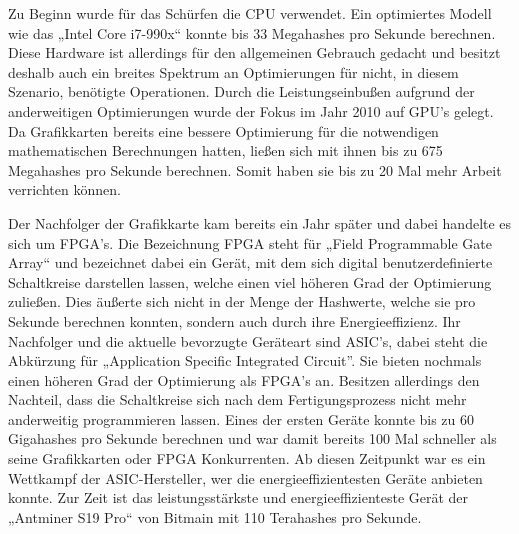 Zu Beginn wurde für das Schürfen die CPU verwendet. Ein optimiertes Modell wie das „Intel Core i7-990x“ konnte bis 33 Megahashes pro Sekunde berechnen. Diese Hardware ist allerdings für den allgemeinen Gebrauch gedacht und besitzt deshalb auch ein breites Spektrum an Optimierungen für nicht, in diesem Szenario, benötigte Operationen. Durch die Leistungseinbußen aufgrund der anderweitigen Optimierungen wurde der Fokus im Jahr 2010 auf GPU’s gelegt. Da Grafikkarten bereits eine bessere Optimierung für die notwendigen mathematischen Berechnungen hatten, ließen sich mit ihnen bis zu 675 Megahashes pro Sekunde berechnen. Somit haben sie bis zu 20 Mal mehr Arbeit verrichten können.

Der Nachfolger der Grafikkarte kam bereits ein Jahr später und dabei handelte es sich um FPGA’s. Die Bezeichnung FPGA steht für „Field Programmable Gate Array“ und bezeichnet dabei ein Gerät, mit dem sich digital benutzerdefinierte Schaltkreise darstellen lassen, welche einen viel höheren Grad der Optimierung zuließen. Dies äußerte sich nicht in der Menge der Hashwerte, welche sie pro Sekunde berechnen konnten, sondern auch durch ihre Energieeffizienz. Ihr Nachfolger und die aktuelle bevorzugte Geräteart sind ASIC’s, dabei steht die Abkürzung für „Application Specific Integrated Circuit”. Sie bieten nochmals einen höheren Grad der Optimierung als FPGA’s an. Besitzen allerdings den Nachteil, dass die Schaltkreise sich nach dem Fertigungsprozess nicht mehr anderweitig programmieren lassen. Eines der ersten Geräte konnte bis zu 60 Gigahashes pro Sekunde berechnen und war damit bereits 100 Mal schneller als seine Grafikkarten oder FPGA Konkurrenten. Ab diesen Zeitpunkt  war es ein Wettkampf der ASIC-Hersteller, wer die energieeffizientesten Geräte anbieten konnte. Zur Zeit ist das leistungsstärkste und energieeffizienteste Gerät der „Antminer S19 Pro“ \cite{michel_rauchs_cbeci_nodate} von Bitmain mit 110 Terahashes pro Sekunde.

